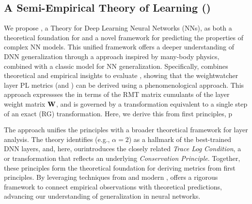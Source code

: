 \subsection{A Semi-Empirical Theory of Learning (\SETOL)}

We propose \SETOL, a \SemiEmpirical Theory for Deep Learning Neural Networks (NNs),
as both a theoretical foundation for \HTSR \Phenomenology
and a novel framework for predicting the properties of complex NN models.
This unified framework offers a deeper understanding of DNN generalization
through a \SemiEmpirical approach inspired by many-body physics,
combined with a classic \STATMECH model for NN generalization.
Specifically, \SETOL combines theoretical and empirical insights to evaluate \ModelQuality,
showing that the weightwatcher layer \HTSR PL metrics (\ALPHA and \ALPHAHAT)
can be derived using a phenomenological \EffectiveHamiltonian approach.
This approach expressses the \HTSR \LayerQuality in terms of the RMT matrix cumulants
of the layer weight matrix ${\mathbf{W}}$,
and is governed by a \ScaleInvariant transformation equivalent
to a single step of an exact \RenormalizationGroup (RG) transformation.
Here, we derive this from first principles, p

The \SETOL approach unifies the \HTSR principles with
a broader theoretical framework for layer analysis.
The \HTSR theory identifies \Universality (e.g., $\alpha=2$) as a hallmark of the best-trained DNN layers,
and, here, our\SETOL introduces the closely related \emph{Trace Log Condition}, a \ScaleInvariant or
\VolumePreserving transformation that reflects an underlying \emph{Conservation Principle}.
Together, these principles form the theoretical foundation for deriving \HTSR \LayerQuality metrics from first principles.
By leveraging techniques from \STATMECH and modern \RMT, \SETOL offers a rigorous framework
to connect empirical observations with theoretical predictions, advancing our understanding of generalization
in neural networks.

